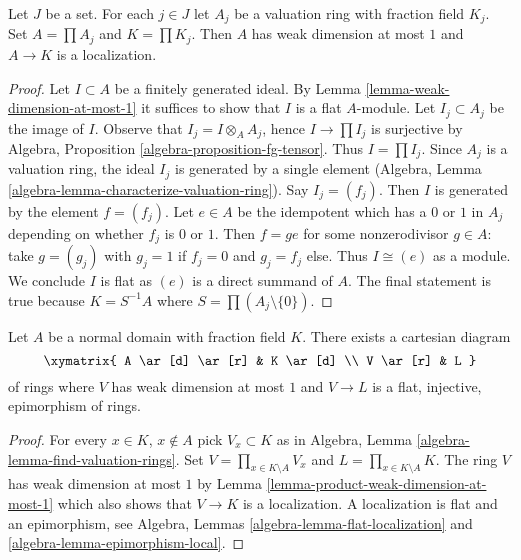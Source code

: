 \begin{lemma}
\label{lemma-product-weak-dimension-at-most-1}
Let $J$ be a set. For each $j \in J$ let
$A_j$ be a valuation ring with fraction field $K_j$.
Set $A = \prod A_j$ and $K = \prod K_j$.
Then $A$ has weak dimension at most $1$ and $A \to K$ is
a localization.
\end{lemma}

\begin{proof}
Let $I \subset A$ be a finitely generated ideal.
By Lemma \ref{lemma-weak-dimension-at-most-1}
it suffices to show that $I$ is a flat $A$-module.
Let $I_j \subset A_j$ be the image of $I$.
Observe that $I_j = I \otimes_A A_j$, hence
$I \to \prod I_j$ is surjective by
Algebra, Proposition \ref{algebra-proposition-fg-tensor}.
Thus $I = \prod I_j$.
Since $A_j$ is a valuation ring, the ideal $I_j$
is generated by a single element
(Algebra, Lemma \ref{algebra-lemma-characterize-valuation-ring}).
Say $I_j = (f_j)$. Then $I$ is generated by the element $f = (f_j)$.
Let $e \in A$ be the idempotent which has a $0$ or $1$
in $A_j$ depending on whether $f_j$ is $0$ or $1$.
Then $f = g e$ for some nonzerodivisor $g \in A$:
take $g = (g_j)$ with $g_j = 1$ if $f_j = 0$ and $g_j = f_j$ else.
Thus $I \cong (e)$ as a module. We conclude $I$ is flat as $(e)$ is a
direct summand of $A$. The final statement is true because
$K = S^{-1}A$ where $S = \prod (A_j \setminus \{0\})$.
\end{proof}

\begin{lemma}
\label{lemma-product-found-valuation-rings}
Let $A$ be a normal domain with fraction field $K$.
There exists a cartesian diagram
$$
\xymatrix{
A \ar[d] \ar[r] & K \ar[d] \\
V \ar[r] & L
}
$$
of rings where $V$ has weak dimension at most $1$
and $V \to L$ is a flat, injective, epimorphism of rings.
\end{lemma}

\begin{proof}
For every $x \in K$, $x \not \in A$ pick $V_x \subset K$ as in
Algebra, Lemma \ref{algebra-lemma-find-valuation-rings}.
Set $V = \prod_{x \in K \setminus A} V_x$ and
$L = \prod_{x \in K \setminus A} K$. The ring $V$
has weak dimension at most $1$ by
Lemma \ref{lemma-product-weak-dimension-at-most-1}
which also shows that $V \to K$ is a localization.
A localization is flat and an epimorphism, see
Algebra, Lemmas \ref{algebra-lemma-flat-localization} and
\ref{algebra-lemma-epimorphism-local}.
\end{proof}

